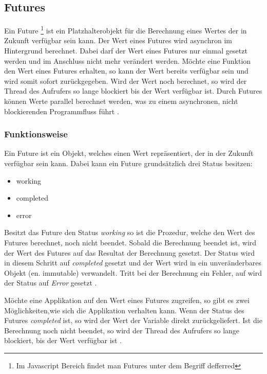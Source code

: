 \subsection{Futures}
\label{section:futures}

Ein Future \footnote{Im Javascript Bereich findet man Futures unter dem Begriff defferred} ist ein Platzhalterobjekt für die Berechnung eines Wertes der in Zukunft verfügbar sein kann. Der Wert eines Futures wird asynchron im Hintergrund berechnet. Dabei darf der Wert eines Futures nur einmal gesetzt werden und im Anschluss nicht mehr verändert werden. Möchte eine Funktion den Wert eines Futures erhalten, so kann der Wert bereits verfügbar sein und wird somit sofort zurückgegeben. Wird der Wert noch berechnet, so wird der Thread des Aufrufers so lange blockiert bis der Wert verfügbar ist. Durch Futures können Werte parallel berechnet werden, was zu einem asynchronen, nicht blockierenden Programmfluss führt \cite[]{ScalaFutures}. 

\subsubsection{Funktionsweise} 

Ein Future ist ein Objekt, welches einen Wert repräsentiert, der in der Zukunft verfügbar sein kann. Dabei kann ein Future grundsätzlich drei Status besitzen: 

\begin{itemize}
  \item working
  \item completed
  \item error
\end{itemize}  
Besitzt das Future den Status \emph{working} so ist die Prozedur, welche den Wert des Futures berechnet, noch nicht beendet. Sobald die Berechnung beendet ist, wird der Wert des Futures auf das Resultat der Berechnung gesetzt. Der Status wird in diesem Schritt auf \emph{completed} gesetzt und der Wert wird in ein unveränderbares Objekt (en. immutable) verwandelt. Tritt bei der Berechnung ein Fehler, auf wird der Status auf \emph{Error} gesetzt \cite[]{ScalaFutures}. 

Möchte eine Applikation auf den Wert eines Futures zugreifen, so gibt es zwei Möglichkeiten,wie sich die Applikation verhalten kann. Wenn der Status des Futures \emph{completed} ist, so wird der Wert der Variable direkt zurückgeliefert. Ist die Berechnung noch nicht beendet, so wird der Thread des Aufrufers so lange blockiert, bis der Wert verfügbar ist \cite[]{ScalaFutures}.

